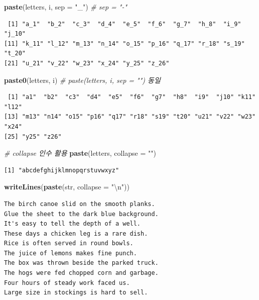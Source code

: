 \documentclass[
  11pt,
]{krantz}
\newenvironment{Shaded}{\begin{snugshade}}{\end{snugshade}}
\newcommand{\CharTok}[1]{\textcolor[rgb]{0.5,0.5,0.5}{#1}}
\newcommand{\CommentTok}[1]{\textcolor[rgb]{0.37,0.37,0.37}{\textit{#1}}}
\newcommand{\DataTypeTok}[1]{\textcolor[rgb]{0.27,0.27,0.27}{#1}}
\newcommand{\KeywordTok}[1]{\textcolor[rgb]{0.27,0.27,0.27}{\textbf{#1}}}
\newcommand{\NormalTok}[1]{#1}
\newcommand{\StringTok}[1]{\textcolor[rgb]{0.5,0.5,0.5}{#1}}
\begin{document}
\begin{Shaded}
\begin{Highlighting}[]
\KeywordTok{paste}\NormalTok{(letters, i, }\DataTypeTok{sep =} \StringTok{"_"}\NormalTok{) }\CommentTok{# sep = "-"}
\end{Highlighting}
\end{Shaded}

\begin{verbatim}
 [1] "a_1"  "b_2"  "c_3"  "d_4"  "e_5"  "f_6"  "g_7"  "h_8"  "i_9"  "j_10"
[11] "k_11" "l_12" "m_13" "n_14" "o_15" "p_16" "q_17" "r_18" "s_19" "t_20"
[21] "u_21" "v_22" "w_23" "x_24" "y_25" "z_26"
\end{verbatim}

\begin{Shaded}
\begin{Highlighting}[]
\KeywordTok{paste0}\NormalTok{(letters, i) }\CommentTok{# paste(letters, i, sep = "") 동일}
\end{Highlighting}
\end{Shaded}

\begin{verbatim}
 [1] "a1"  "b2"  "c3"  "d4"  "e5"  "f6"  "g7"  "h8"  "i9"  "j10" "k11" "l12"
[13] "m13" "n14" "o15" "p16" "q17" "r18" "s19" "t20" "u21" "v22" "w23" "x24"
[25] "y25" "z26"
\end{verbatim}

\begin{Shaded}
\begin{Highlighting}[]
\CommentTok{# collapse 인수 활용}
\KeywordTok{paste}\NormalTok{(letters, }\DataTypeTok{collapse =} \StringTok{""}\NormalTok{)}
\end{Highlighting}
\end{Shaded}

\begin{verbatim}
[1] "abcdefghijklmnopqrstuvwxyz"
\end{verbatim}

\begin{Shaded}
\begin{Highlighting}[]
\KeywordTok{writeLines}\NormalTok{(}\KeywordTok{paste}\NormalTok{(str, }\DataTypeTok{collapse =} \StringTok{"}\CharTok{\textbackslash{}n}\StringTok{"}\NormalTok{))}
\end{Highlighting}
\end{Shaded}

\begin{verbatim}
The birch canoe slid on the smooth planks.
Glue the sheet to the dark blue background.
It's easy to tell the depth of a well.
These days a chicken leg is a rare dish.
Rice is often served in round bowls.
The juice of lemons makes fine punch.
The box was thrown beside the parked truck.
The hogs were fed chopped corn and garbage.
Four hours of steady work faced us.
Large size in stockings is hard to sell.
\end{verbatim}
\end{document}
